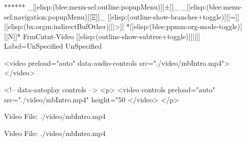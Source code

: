 \begin{frame}[fragile,plain,label=thisIsMohsen]
    \frametitle{}

\begin{whenOrg}
******  _[[elisp:(blee:menu-sel:outline:popupMenu)][±]]_ _[[elisp:(blee:menu-sel:navigation:popupMenu)][Ξ]]_ [[elisp:(outline-show-branches+toggle)][|=]] [[elisp:(bx:orgm:indirectBufOther)][|>]] *[[elisp:(blee:ppmm:org-mode-toggle)][|N]]*  FrmCntnt-Video [[elisp:(outline-show-subtree+toggle)][||]] Label=UnSpecified UnSpecified
\end{whenOrg}
\begin{presentationMode}
\begin{htmlonly}
  \begin{rawhtml}
<video preload="auto" data-audio-controls src="./video/mbIntro.mp4"></video>
  \end{rawhtml}
\end{htmlonly}
\end{presentationMode}

\begin{articleMode}
\begin{htmlonly}
  \begin{rawhtml}
      <!-- data-autoplay  controls -->
    <p>
    <video  controls   preload="auto"  src="./video/mbIntro.mp4"  height="50%
    </video>
    </p>
  \end{rawhtml}
\end{htmlonly}
\end{articleMode}

\begin{presentationMode}
\begin{latexonly}
    \begin{center}
      Video File: ./video/mbIntro.mp4
    \end{center}
\end{latexonly}
\end{presentationMode}

\begin{articleMode}
\begin{latexonly}
    \begin{center}
      Video File: ./video/mbIntro.mp4
    \end{center}
\end{latexonly}
\end{articleMode}


\end{frame}
